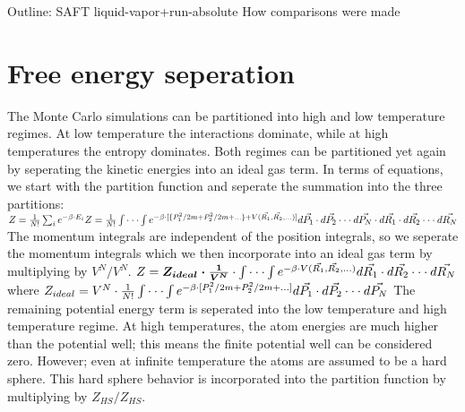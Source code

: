 Outline:
SAFT\newline
liquid-vapor+run-absolute\newline
How comparisons were made\newline
\section{Free energy seperation}
The Monte Carlo simulations can be partitioned into high and low temperature regimes. At low temperature the interactions dominate, while at high temperatures the entropy dominates. Both regimes can be partitioned yet again by seperating the kinetic energies into an ideal gas term. In terms of equations, we start with the partition function and seperate the summation into the three partitions:
$\newline Z=\frac{1}{N!}\sum_i e^{-\beta\cdot E_i}
\newline Z=\frac{1}{N!}\int\cdot\cdot\cdot\int e^{-\beta\cdot [\{P_{1}^2/{2m}+P_{2}^2/{2m}+...\}+V(\vec{R_1},\vec{R_2},...)]}d\vec{P_1}\cdot d\vec{P_2}\cdot\cdot\cdot d\vec{P_N}\cdot d\vec{R_1}\cdot d\vec{R_2}\cdot\cdot\cdot d\vec{R_N}\newline$
The momentum integrals are independent of the position integrals, so we seperate the momentum integrals which we then incorporate into an ideal gas term by multiplying by $V^N/V^N$.
$\newline Z=\boldsymbol{Z_{ideal} \cdot \frac{1}{V^N}}\cdot \int\cdot\cdot\cdot\int e^{-\beta\cdot V(\vec{R_1},\vec{R_2},...)}d\vec{R_1}\cdot d\vec{R_2}\cdot\cdot\cdot d\vec{R_N}\newline$
where $Z_{ideal}=V^N\cdot\frac{1}{N!}\int\cdot\cdot\cdot\int e^{-\beta\cdot [P_{1}^2/{2m}+P_{2}^2/{2m}+...]}d\vec{P_1}\cdot d\vec{P_2}\cdot\cdot\cdot d\vec{P_N}\newline$
The remaining potential energy term is seperated into the low temperature and high temperature regime. At high temperatures, the atom energies are much higher than the potential well; this means the finite potential well can be considered zero. However; even at infinite temperature the atoms are assumed to be a hard sphere. This hard sphere behavior is incorporated into the partition function by multiplying by $Z_{HS}/Z_{HS}$.
